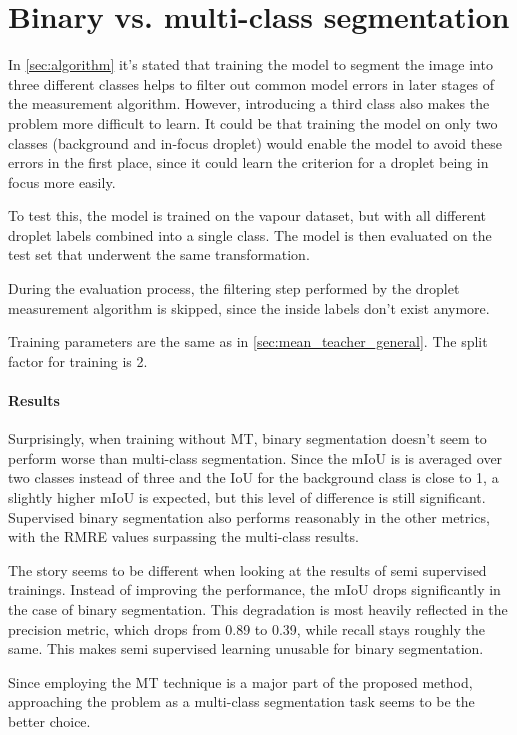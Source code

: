 \section{Binary vs. multi-class segmentation}
\label{sec:binary}

In \ref{sec:algorithm} it's stated that training the model to segment the image into three different classes helps to filter out common model errors in later stages of the measurement algorithm. 
However, introducing a third class also makes the problem more difficult to learn. It could be that training the model on only two classes (background and in-focus droplet) would enable the model to avoid these errors in the first place, since it could learn the criterion for a droplet being in focus more easily.

To test this, the model is trained on the vapour dataset, but with all different droplet labels combined into a single class. The model is then evaluated on the test set that underwent the same transformation. 

During the evaluation process, the filtering step performed by the droplet measurement algorithm is skipped, since the inside labels don't exist anymore. 

Training parameters are the same as in \ref{sec:mean_teacher_general}. The split factor for training is 2.

\paragraph{Results}

Surprisingly, when training without MT, binary segmentation doesn't seem to perform worse than multi-class segmentation.
Since the mIoU is is averaged over two classes instead of three and the IoU for the background class is close to 1, a slightly higher mIoU is expected, but this level of difference is still significant. 
Supervised binary segmentation also performs reasonably in the other metrics, with the RMRE values surpassing the multi-class results.

The story seems to be different when looking at the results of semi supervised trainings. 
Instead of improving the performance, the mIoU drops significantly in the case of binary segmentation.
This degradation is most heavily reflected in the precision metric, which drops from 0.89 to 0.39, while recall stays roughly the same.
This makes semi supervised learning unusable for binary segmentation.

Since employing the MT technique is a major part of the proposed method, approaching the problem as a multi-class segmentation task seems to be the better choice.

